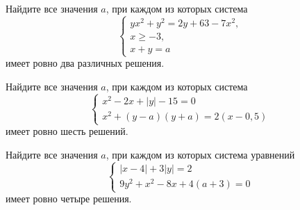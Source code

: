 \begin{class}[number=2]
	\begin{listofex}
		\item Найдите все значения \(a\), при каждом из которых система \[ \begin{cases} yx^2+y^2=2y+63-7x^2, \\ x \ge -3, \\ x+y=a  \end{cases} \] имеет ровно два различных решения.
		\item Найдите все значения \(a\), при каждом из которых система \[ \begin{cases} x^2-2x+|y|-15=0 \\ x^2+(y-a)(y+a)=2 (x-0,5)  \end{cases} \] имеет ровно шесть решений.
		\item Найдите все значения \(a\), при каждом из которых система уравнений \[ \begin{cases} |x-4|+3|y|=2 \\ 9y^2+x^2-8x+4(a+3)=0 \end{cases} \] имеет ровно четыре решения.
	\end{listofex}
\end{class}

